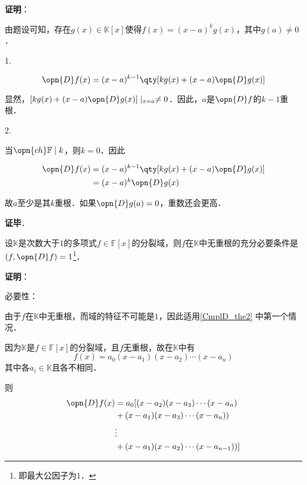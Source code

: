 \textbf{证明}：

由题设可知，存在$g(x)\in\mathbb{K}[x]$使得$f(x) = (x-a)^k g(x)$，其中$g(a)\neq 0$．

1. 

\begin{equation}
\opn{D}f(x)=(x-a)^{k-1}\qty[kg(x)+(x-a)\opn{D}g(x)]
\end{equation}

显然，$[kg(x)+(x-a)\opn{D}g(x)]\mid_{x=a}\neq 0$．因此，$a$是$\opn{D}f$的$k-1$重根．


2. 

当$\opn{ch}\mathbb{F}\mid k$，则$k=0$．因此

\begin{equation}
\begin{aligned}
\opn{D}f(x)&=(x-a)^{k-1}\qty[kg(x)+(x-a)\opn{D}g(x)]\\
&=(x-a)^k\opn{D}g(x)
\end{aligned}
\end{equation}

故$a$至少是其$k$重根．如果$\opn{D}g(a)=0$，重数还会更高．

\textbf{证毕}．



\begin{corollary}{}\label{CmplD_cor1}
设$\mathbb{K}$是次数大于$1$的多项式$f\in\mathbb{F}[x]$的分裂域，则$f$在$\mathbb{K}$中无重根的充分必要条件是$(f, \opn{D}f)=1$\footnote{即最大公因子为$1$．}．
\end{corollary}

\textbf{证明}：

必要性：

由于$f$在$\mathbb{K}$中无重根，而域的特征不可能是$1$，因此适用\autoref{CmplD_the2} 中第一个情况．

因为$\mathbb{K}$是$f\in\mathbb{F}[x]$的分裂域，且$f$无重根，故在$\mathbb{K}$中有
\begin{equation}
f(x) = a_0(x-a_1)(x-a_2)\cdots(x-a_n)
\end{equation}
其中各$a_i\in\mathbb{K}$且各不相同．

则
\begin{equation}
\begin{aligned}
\opn{D}f(x) &= a_0[(x-a_2)(x-a_3)\cdots(x-a_n)\\
&+(x-a_1)(x-a_3)\cdots(x-a_n))\\
&\vdots\\
&+(x-a_1)(x-a_2)\cdots(x-a_{n-1}))
]
\end{aligned}
\end{equation}

